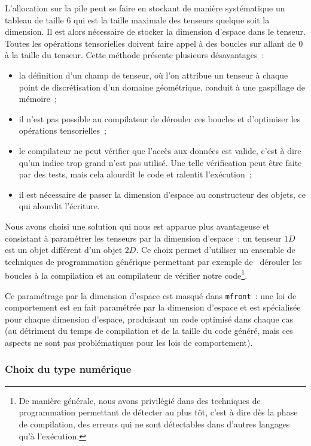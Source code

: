 \documentclass[rectoverso,pleiades,pstricks,leqno,anti]{texmf/note_technique_2010}
\newcommand{\mfront}{\texttt{mfront}}
\newcommand{\tfel}[1]{\index{tfel}{#1}{\texttt{#1}}}
\begin{document}
L'allocation sur la pile peut se faire en stockant de manière
systématique un tableau de taille \(6\) qui est la taille maximale des
tenseurs quelque soit la dimension. Il est alors nécessaire de stocker
la dimension d'espace dans le tenseur. Toutes les opérations
tensorielles doivent faire appel à des boucles sur allant de \(0\) à la
taille du tenseur. Cette méthode présente plusieurs désavantages~:
\begin{itemize}
  \item la définition d'un champ de tenseur, où l'on attribue un tenseur
  à chaque point de discrétisation d'un domaine géométrique, conduit à
  une gaspillage de mémoire~;
  \item il n'est pas possible au compilateur de dérouler ces boucles et
  d'optimiser les opérations tensorielles~;
  \item le compilateur ne peut vérifier que l'accès aux données est
  valide, c'est à dire qu'un indice trop grand n'est pas utilisé. Une
  telle vérification peut être faite par des tests, mais cela alourdit
  le code et ralentit l'exécution~;
  \item il est nécessaire de passer la dimension d'espace au
  constructeur des objets, ce qui alourdit l'écriture.
\end{itemize}

Nous avons choisi une solution qui nous est apparue plus avantageuse et
consistant à paramétrer les tenseurs par la dimension d'espace~: un
tenseur \(1D\) est un objet différent d'un objet \(2D\). Ce choix permet
d'utiliser un ensemble de techniques de programmation générique
permettant par exemple de \og~dérouler les boucles\fg{} à la compilation
et au compilateur de vérifier notre code\footnote{De manière générale,
  nous avons privilégié dans \tfel{} des techniques de programmation
  permettant de détecter au plus tôt, c'est à dire dès la phase de
  compilation, des erreurs qui ne sont détectables dans d'autres
  langages qu'à l'exécution.}.

Ce paramétrage par la dimension d'espace est masqué dans \mfront{}~:
une loi de comportement est en fait paramétrée par la dimension
d'espace et est spécialisée pour chaque dimension d'espace, produisant
un code optimisé dans chaque cas (au détriment du temps de compilation
et de la taille du code généré, mais ces aspects ne sont pas
problématiques pour les lois de comportement).

\subsubsection{Choix du type numérique}
\end{document}
